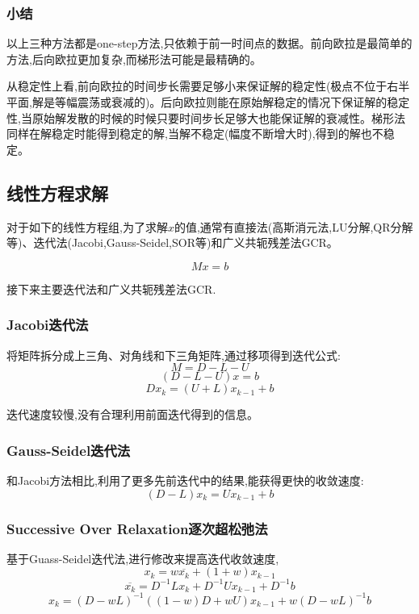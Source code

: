 \documentclass[12pt]{article}
\begin{document}
\begin{sloppypar}
\subsubsection{小结}
\qquad 以上三种方法都是one-step方法,只依赖于前一时间点的数据。前向欧拉是最简单的方法,后向欧拉更加复杂,而梯形法可能是最精确的。

\qquad 从稳定性上看,前向欧拉的时间步长需要足够小来保证解的稳定性(极点不位于右半平面,解是等幅震荡或衰减的)。后向欧拉则能在原始解稳定的情况下保证解的稳定性,当原始解发散的时候的时候只要时间步长足够大也能保证解的衰减性。梯形法同样在解稳定时能得到稳定的解,当解不稳定(幅度不断增大时),得到的解也不稳定。

\subsection{线性方程求解}
对于如下的线性方程组,为了求解$x$的值,通常有直接法(高斯消元法,LU分解,QR分解等)、迭代法(Jacobi,Gauss-Seidel,SOR等)和广义共轭残差法GCR。

\begin{equation}
    Mx=b
\end{equation}

接下来主要迭代法和广义共轭残差法GCR.

\subsubsection{Jacobi迭代法}
\qquad 将矩阵拆分成上三角、对角线和下三角矩阵,通过移项得到迭代公式:
\begin{equation}
    M=D-L-U
\end{equation}
\begin{equation}
    (D-L-U)x=b
\end{equation}
\begin{equation}
    Dx_k=(U+L)x_{k-1}+b
\end{equation}

\qquad 迭代速度较慢,没有合理利用前面迭代得到的信息。
\subsubsection{Gauss-Seidel迭代法}
\qquad 和Jacobi方法相比,利用了更多先前迭代中的结果,能获得更快的收敛速度:
\begin{equation}
    (D-L)x_k=Ux_{k-1}+b
\end{equation}
\subsubsection{Successive Over Relaxation逐次超松弛法}
\qquad 基于Guass-Seidel迭代法,进行修改来提高迭代收敛速度,
\begin{equation}
  x_k = w\overline{x_k} + (1+w)x_{k-1}
\end{equation}
\begin{equation}
  \overline{x_k} = D^{-1}Lx_k + D^{-1}Ux_{k-1} + D^{-1}b
\end{equation}
\begin{equation}
  x_k = (D-wL)^{-1}((1-w)D+wU)x_{k-1} + w(D-wL)^{-1}b
\end{equation}


\end{sloppypar}
\end{document}
